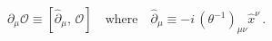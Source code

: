 \begin{equation}
\partial_{\mu}\mathcal{O}\equiv \left[ \hat{\partial}_{\mu},\,\mathcal{O}
\right]\quad \textrm{where}\quad 
\hat{\partial}_{\mu}\equiv -i\,(\theta^{-1})_{\mu\nu}\hat{x}^{\nu}\,.
\label{eq:3.4}
\end{equation}

